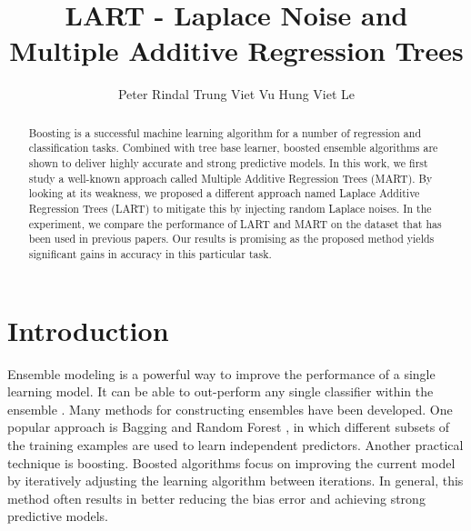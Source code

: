 \documentclass{article} %
\title{LART - Laplace Noise and Multiple Additive Regression Trees}
\author{Peter Rindal 
\And
Trung Viet Vu 
\And
Hung Viet Le}
\begin{document}
 
\maketitle

\begin{abstract}

Boosting is a successful machine learning algorithm for a number of regression and classification tasks. Combined with tree base learner, boosted ensemble algorithms are shown to deliver highly accurate and strong predictive models. In this work, we first study a well-known approach called Multiple Additive Regression Trees (MART). By looking at its weakness, we proposed a different approach named Laplace Additive Regression Trees (LART) to mitigate this by injecting random Laplace noises. In the experiment, we compare the performance of LART and MART on the dataset that has been used in previous papers. Our results is promising as the proposed method yields significant gains in accuracy in this particular task.

\end{abstract}

\section{Introduction}


Ensemble modeling is a powerful way to improve the performance of a single learning model.  It can be able to out-perform any single classifier within the ensemble \cite{Dietterich2000}. Many methods for constructing ensembles have been developed. One popular approach is Bagging and Random Forest \cite{Breiman2001}, in which different subsets of the training examples are used to learn independent predictors. Another practical technique is boosting. Boosted algorithms focus on improving the current model by iteratively adjusting the learning algorithm between iterations. In general, this method often results in better reducing the bias error and achieving strong predictive models. \\
\end{document}
